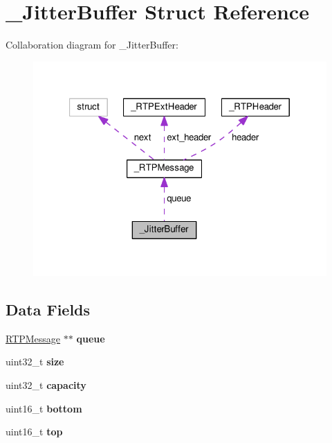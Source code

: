 \hypertarget{struct___jitter_buffer}{\section{\+\_\+\+Jitter\+Buffer Struct Reference}
\label{struct___jitter_buffer}
}


Collaboration diagram for \+\_\+\+Jitter\+Buffer\+:
\nopagebreak
\begin{figure}[H]
\begin{center}
\leavevmode
\includegraphics[width=321pt]{struct___jitter_buffer__coll__graph}
\end{center}
\end{figure}
\subsection*{Data Fields}
\begin{DoxyCompactItemize}
\item 
\hypertarget{struct___jitter_buffer_aba0e7057fa735d7bfaa585fd7bf43a24}{\hyperlink{struct___r_t_p_message}{R\+T\+P\+Message} $\ast$$\ast$ {\bfseries queue}}\label{struct___jitter_buffer_aba0e7057fa735d7bfaa585fd7bf43a24}

\item 
\hypertarget{struct___jitter_buffer_ab2c6b258f02add8fdf4cfc7c371dd772}{uint32\+\_\+t {\bfseries size}}\label{struct___jitter_buffer_ab2c6b258f02add8fdf4cfc7c371dd772}

\item 
\hypertarget{struct___jitter_buffer_a391c992c66c3e5540265a85ec2b9216a}{uint32\+\_\+t {\bfseries capacity}}\label{struct___jitter_buffer_a391c992c66c3e5540265a85ec2b9216a}

\item 
\hypertarget{struct___jitter_buffer_a12c8099ac87952580dd090215e02728c}{uint16\+\_\+t {\bfseries bottom}}\label{struct___jitter_buffer_a12c8099ac87952580dd090215e02728c}

\item 
\hypertarget{struct___jitter_buffer_a0c235a6df98714bb18538fc0afc5bad1}{uint16\+\_\+t {\bfseries top}}\label{struct___jitter_buffer_a0c235a6df98714bb18538fc0afc5bad1}

\end{DoxyCompactItemize}


